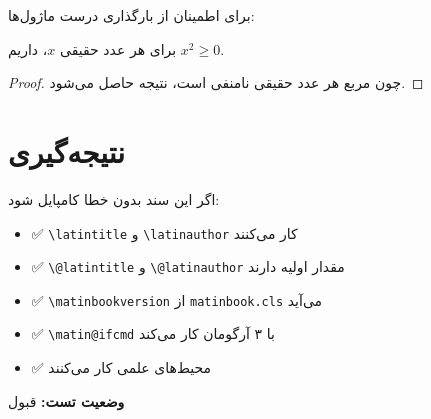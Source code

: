 \documentclass{matinbook}
\begin{document}
برای اطمینان از بارگذاری درست ماژول‌ها:

\begin{theorem}
    برای هر عدد حقیقی $x$، داریم $x^2 \geq 0$.
\end{theorem}

\begin{proof}
    چون مربع هر عدد حقیقی نامنفی است، نتیجه حاصل می‌شود.
\end{proof}

\section{نتیجه‌گیری}
\label{sec:conclusion}

اگر این سند بدون خطا کامپایل شود:

\begin{itemize}
    \item ✅ \texttt{\textbackslash latintitle} و \texttt{\textbackslash latinauthor} کار می‌کنند
    \item ✅ \texttt{\textbackslash @latintitle} و \texttt{\textbackslash @latinauthor} مقدار اولیه دارند
    \item ✅ \texttt{\textbackslash matinbookversion} از \texttt{matinbook.cls} می‌آید
    \item ✅ \texttt{\textbackslash matin@ifcmd} با ۳ آرگومان کار می‌کند
    \item ✅ محیط‌های علمی کار می‌کنند
\end{itemize}

\textbf{وضعیت تست:} قبول
\end{document}
